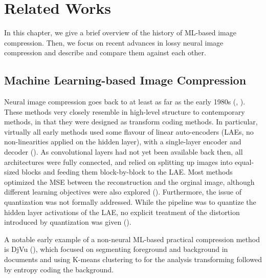 
\chapter{Related Works}
\label{chapter:related_works}

\graphicspath{{../img/related_works/}}

\par
In this chapter, we give a brief overview of the history of ML-based image
compression. Then, we focus on recent advances in lossy neural image compression
and describe and compare them against each other.

\section{Machine Learning-based Image Compression}
\par
Neural image compression goes back to at least as far as the early 1980s
(\cite{mougeot1991image}, \cite{jiang1999image}). These methods very closely
resemble in high-level structure to contemporary methods, in that they were
designed as transform coding methods. In particular, virtually all early methods
used some flavour of linear auto-encoders (LAEs, no non-linearities applied on
the hidden layer), with a single-layer encoder and
decoder (\cite{jiang1999image}). As convolutional layers had not yet been
available back then, all architectures were fully connected,
and relied on splitting up images into equal-sized blocks and feeding them
block-by-block to the LAE. Most methods optimized the MSE between the
reconstruction and the orginal image, although different learning objectives
were also explored (\cite{mougeot1991image}). Furthermore, the issue of
quantization was not formally addressed. While the pipeline was to quantize the hidden
layer activations of the LAE, no explicit treatment of the distortion introduced
by quantization was given (\cite{jiang1999image}).

\par
A notable early example of a non-neural ML-based practical compression method
is DjVu (\cite{bottou1998high}), which focused on segmenting foreground and
background in documents and using K-means clustering to for the analysis
transforming followed by entropy coding the background.

